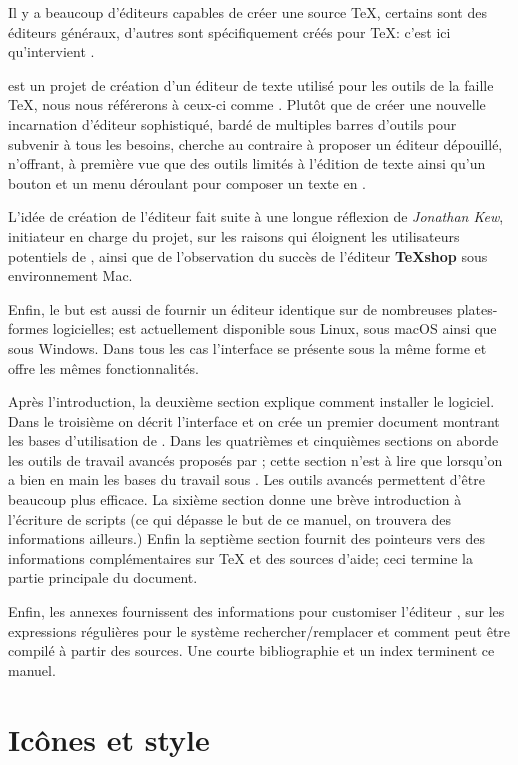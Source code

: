 Il y a beaucoup d'éditeurs capables de créer une source \TeX, certains sont des éditeurs généraux, d'autres sont spécifiquement créés pour \TeX: c'est ici qu'intervient \Tw{}.
\bigskip

\Tw{} est un projet de création d'un éditeur de texte utilisé pour les outils de la faille \TeX, nous nous référerons à ceux-ci comme \AllTeX. Plutôt que de créer une nouvelle incarnation d'éditeur sophistiqué, bardé de multiples barres d'outils pour subvenir à tous les besoins, \Tw{} cherche au contraire à proposer un éditeur dépouillé, n'offrant, à première vue que des outils limités à l'édition de texte ainsi qu'un bouton et un menu déroulant pour composer un texte en \AllTeX.

L'idée de création de l'éditeur fait suite à une longue réflexion de \emph{Jonathan Kew}, initiateur en charge du projet, sur les raisons qui éloignent les utilisateurs potentiels de \AllTeX, ainsi que de l'observation du succès de l'éditeur \textbf{\TeX shop} sous environnement Mac.

Enfin, le but est aussi de fournir un éditeur identique sur de nombreuses plates-formes logicielles; \Tw{} est actuellement disponible sous Linux, sous macOS ainsi que sous Windows. Dans tous les cas l'interface se présente sous la même forme et offre les mêmes fonctionnalités.

Après l'introduction, la deuxième section explique comment installer le logiciel. Dans le troisième on décrit l'interface et on crée un premier document montrant les bases d'utilisation de \Tw. Dans les quatrièmes et cinquièmes sections on aborde les outils de travail avancés proposés par \Tw{}; cette section n'est à lire que lorsqu'on a bien en main les bases du travail sous \Tw{}. Les outils avancés permettent d'être beaucoup plus efficace. La sixième section donne une brève introduction à l'écriture de scripts (ce qui dépasse le but de ce manuel, on trouvera des informations ailleurs.) Enfin la septième section fournit des pointeurs vers des informations complémentaires sur \TeX{} et des sources d'aide; ceci termine la partie principale du document.

Enfin, les annexes fournissent des informations pour \og customiser\fg{} l'éditeur \Tw, sur les expressions régulières pour le système rechercher/remplacer et comment \Tw{} peut être compilé à partir des sources. Une courte bibliographie et un index terminent ce manuel.

\section{Icônes et style}

